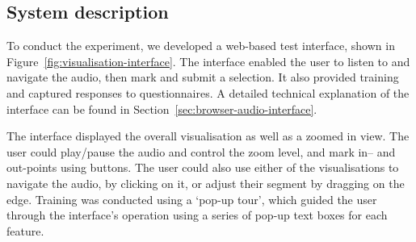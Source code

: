 

\subsection{System description}

To conduct the experiment, we developed a web-based test interface, shown in Figure~\ref{fig:visualisation-interface}.
The interface enabled the user to listen to and navigate the audio, then mark and submit a selection. It also provided
training and captured responses to questionnaires.  A detailed technical explanation of the interface can be found in
Section~\ref{sec:browser-audio-interface}.

The interface displayed the overall visualisation as well as a zoomed in view. The user could play/pause the audio and
control the zoom level, and mark in-- and out-points using buttons. The user could also use either of the
visualisations to navigate the audio, by clicking on it, or adjust their segment by dragging on the edge.  Training was
conducted using a `pop-up tour', which guided the user through the interface's operation using a series of pop-up text
boxes for each feature.

